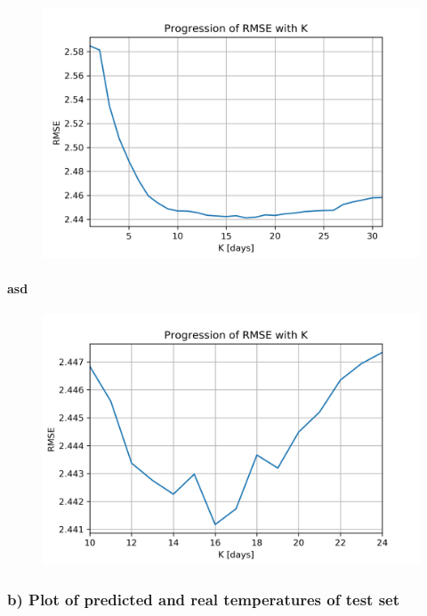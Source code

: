 \documentclass[a4paper]{article}
\begin{document}
\begin{figure}[ht]
    \centering
    \includegraphics[width=12cm]{figure_1_rmse_with_k}
    \caption{}
    \label{fig:ex1-1}
\end{figure}

\paragraph{asd}

\begin{figure}[ht]
    \centering
    \includegraphics[width=12cm]{figure_2_rmse_with_k_zoom}
    \caption{}
    \label{fig:ex1-2}
\end{figure}

\subsubsection{b) Plot of predicted and real temperatures of test set}
\end{document}
